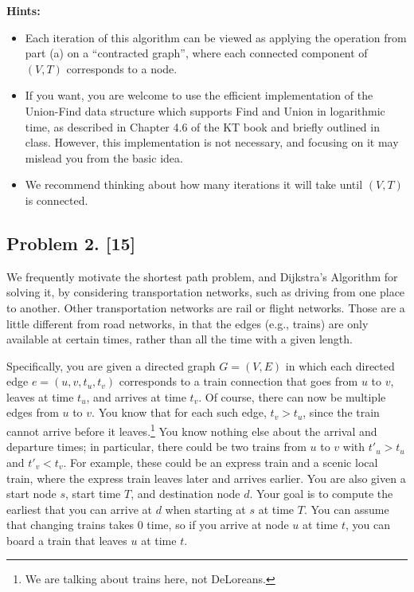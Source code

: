 \documentclass[10pt]{article}
\begin{document}
\noindent \textbf{Hints:}
\begin{itemize}
  \renewcommand{\labelitemi}{$\bullet$}
  \item Each iteration of this algorithm can be viewed as applying the operation from part (a) on a ``contracted graph'', where each connected component of $(V,T)$ corresponds to a node.
  \item If you want, you are welcome to use the efficient implementation of the Union-Find data structure which supports Find and Union in logarithmic time, as described in Chapter 4.6 of the KT book and briefly outlined in class. However, this implementation is not necessary, and focusing on it may mislead you from the basic idea.
  \item We recommend thinking about how many iterations it will take until $(V,T)$ is connected.
\end{itemize}


\subsection*{Problem 2. [15]}

  We frequently motivate the shortest path problem, and Dijkstra's Algorithm for solving it, by considering transportation networks, such as driving from one place to another.
  Other transportation networks are rail or flight networks. Those are a little different from road networks, in that the edges (e.g., trains) are only available at certain times, rather than all the time with a given length.

  Specifically, you are given a directed graph $G=(V,E)$ in which each directed edge $e=(u,v,t_u,t_v)$ corresponds to a train connection that goes from $u$ to $v$, leaves at time $t_u$, and arrives at time $t_v$. Of course, there can now be multiple edges from $u$ to $v$. You know that for each such edge, $t_v > t_u$, since the train cannot arrive before it leaves.\footnote{We are talking about trains here, not DeLoreans.} You know nothing else about the arrival and departure times; in particular, there could be two trains from $u$ to $v$ with $t'_u > t_u$ and $t'_v < t_v$. For example, these could be an express train and a scenic local train, where the express train leaves later and arrives earlier.
  You are also given a start node $s$, start time $T$, and destination node $d$.
  Your goal is to compute the earliest that you can arrive at $d$ when starting at $s$ at time $T$. You can assume that changing trains takes 0 time, so if you arrive at node $u$ at time $t$, you can board a train that leaves $u$ at time $t$.
\end{document}

